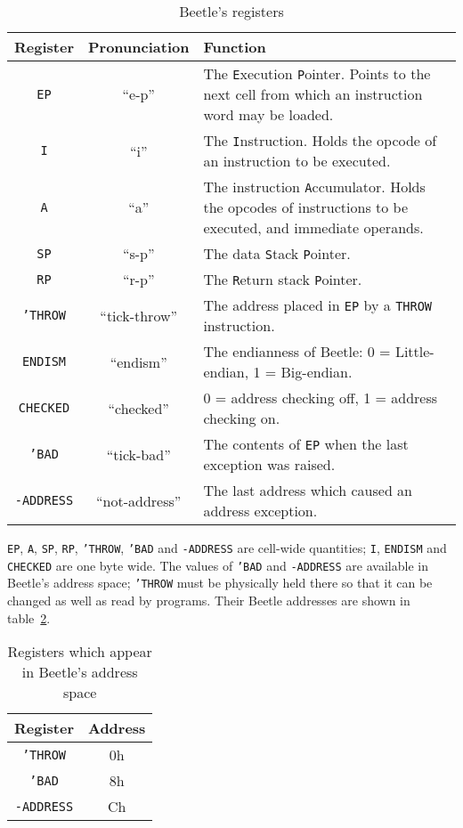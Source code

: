 \documentclass[english]{article}
\newlength{\opcode}\opcode=0.5in
\begin{document}
\begin{table}[htbp]
\begin{center}
\begin{tabular}{ccp{3.75in}} \toprule
\bf Register & \bf Pronunciation & \bf Function \\
    \midrule
{\tt EP} & ``e-p'' & The {\tt E}xecution {\tt P}ointer. Points to the next
    cell from which an instruction word may be loaded. \\
{\tt I} & ``i'' & The {\tt I}nstruction. Holds the opcode of an instruction
    to be executed. \\
{\tt A} & ``a'' & The instruction {\tt A}ccumulator. Holds the opcodes of
    instructions to be executed, and immediate operands. \\
{\tt SP} & ``s-p'' & The data {\tt S}tack {\tt P}ointer. \\
{\tt RP} & ``r-p'' & The {\tt R}eturn stack {\tt P}ointer. \\
{\tt 'THROW} & ``tick-throw'' & The address placed in {\tt EP} by a {\tt THROW}
    instruction. \\
{\tt ENDISM} & ``endism'' & The endianness of Beetle: 0 = Little-endian,
    1 = Big-endian. \\
{\tt CHECKED} & ``checked'' & 0 = address checking off, 1 = address checking
    on. \\
{\tt 'BAD} & ``tick-bad'' & The contents of {\tt EP} when the last exception
    was raised. \\
{\tt -ADDRESS} & ``not-address'' & The last address which caused an address
    exception. \\ \bottomrule
\end{tabular}
\caption{\label{regtable}Beetle's registers}
\end{center}
\end{table}

{\tt EP}, {\tt A}, {\tt SP}, {\tt RP}, {\tt 'THROW}, {\tt 'BAD}
and {\tt -ADDRESS} are cell-wide quantities; {\tt I}, {\tt ENDISM} and {\tt
CHECKED} are one byte wide. The
values of {\tt 'BAD} and {\tt -ADDRESS} are available in Beetle's
address space; {\tt 'THROW} must be physically held there so that it can be
changed as well as read by programs. Their Beetle addresses are
shown in table~\ref{mappedtable}.

\begin{table}[htbp]
\begin{center}
\begin{tabular}{cc} \toprule
\bf Register & \bf Address \\ \midrule
{\tt 'THROW} & 0h \\
{\tt 'BAD} & 8h \\
{\tt -ADDRESS} & Ch \\ \bottomrule
\end{tabular}
\caption{\label{mappedtable}Registers which appear in Beetle's address space}
\end{center}
\end{table}
\end{document}
